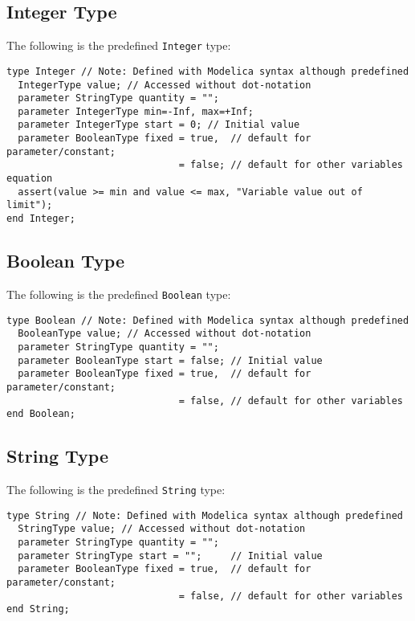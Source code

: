 \subsection{Integer Type}
The following is the predefined \lstinline!Integer! type:
\begin{lstlisting}[language=modelica]
type Integer // Note: Defined with Modelica syntax although predefined
  IntegerType value; // Accessed without dot-notation
  parameter StringType quantity = "";
  parameter IntegerType min=-Inf, max=+Inf;
  parameter IntegerType start = 0; // Initial value
  parameter BooleanType fixed = true,  // default for parameter/constant;
                              = false; // default for other variables
equation
  assert(value >= min and value <= max, "Variable value out of limit");
end Integer;
\end{lstlisting}

\subsection{Boolean Type}
The following is the predefined \lstinline!Boolean! type:
\begin{lstlisting}[language=modelica]
type Boolean // Note: Defined with Modelica syntax although predefined
  BooleanType value; // Accessed without dot-notation
  parameter StringType quantity = "";
  parameter BooleanType start = false; // Initial value
  parameter BooleanType fixed = true,  // default for parameter/constant;
                              = false, // default for other variables
end Boolean;
\end{lstlisting}

\subsection{String Type}

The following is the predefined \lstinline!String! type:
\begin{lstlisting}[language=modelica]
type String // Note: Defined with Modelica syntax although predefined
  StringType value; // Accessed without dot-notation
  parameter StringType quantity = "";
  parameter StringType start = "";     // Initial value
  parameter BooleanType fixed = true,  // default for parameter/constant;
                              = false, // default for other variables
end String;
\end{lstlisting}

